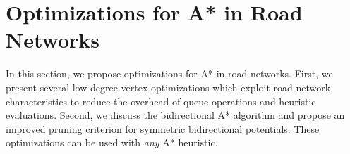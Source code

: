 \documentclass[manuscript,review]{acmart}
\begin{document}


\section{Optimizations for A* in Road Networks}\label{sec:astar_opts}

In this section, we propose optimizations for A* in road networks.
First, we present several low-degree vertex optimizations which exploit road network characteristics to reduce the overhead of queue operations and heuristic evaluations.
Second, we discuss the bidirectional A* algorithm and propose an improved pruning criterion for symmetric bidirectional potentials.
These optimizations can be used with \emph{any} A* heuristic.
\end{document}
